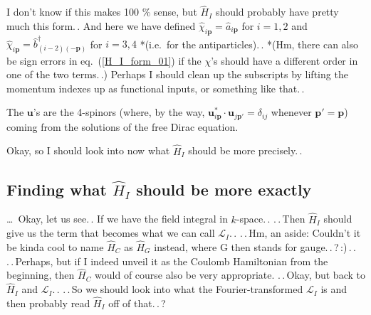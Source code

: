 \documentclass{report}
\begin{document}
I don't know if this makes 100 \% sense, but $\hat H_I$ should probably have pretty much this form.\,. And here we have defined $\hat \chi_{i \boldsymbol{p}} = \hat a_{i \boldsymbol{p}}$ for $i=1,2$ and $\hat \chi_{i \boldsymbol{p}} = \hat b^\dagger_{(i-2) (-\boldsymbol{p})}$ for $i=3,4$ *(i.e.\ for the antiparticles).\,. *(Hm, there can also be sign errors in eq.\ (\ref{H_I_form_01}) if the $\chi$'s should have a different order in one of the two terms.\,.) Perhaps I should clean up the subscripts by lifting the momentum indexes up as functional inputs, or something like that.\,. 

The $\boldsymbol u$'s are the 4-spinors %
(where, by the way, $\boldsymbol u_{i \boldsymbol{p}}^* \cdot \boldsymbol u_{j \boldsymbol{p}'} = \delta_{i j}$ whenever $\boldsymbol{p}' = \boldsymbol{p}$) coming from the solutions of the free Dirac equation.

Okay, so I should look into now what $\hat H_{I}$ should be more precisely.\,. 

\subsection{Finding what $\hat H_I$ should be more exactly}
\ldots\ Okay, let us see.\,. If we have the field integral in $k$-space.\,. .\,.\,Then $\hat H_I$ should give us the term that becomes what we can call $\mathcal{L}_I$.\,. .\,.\,Hm, an aside: Couldn't it be kinda cool to name $\hat H_C$ as $\hat H_G$ instead, where G then stands for gauge.\,.\,?\,:)\,.\,. .\,.\,Perhaps, but if I indeed unveil it as the Coulomb Hamiltonian from the beginning, then $\hat H_C$ would of course also be very appropriate. .\,.\,Okay, but back to $\hat H_I$ and $\mathcal{L}_I$.\,. .\,.\,So we should look into what the Fourier-transformed $\mathcal{L}_I$ is and then probably read $\hat H_I$ off of that.\,.\,? 
\end{document}
